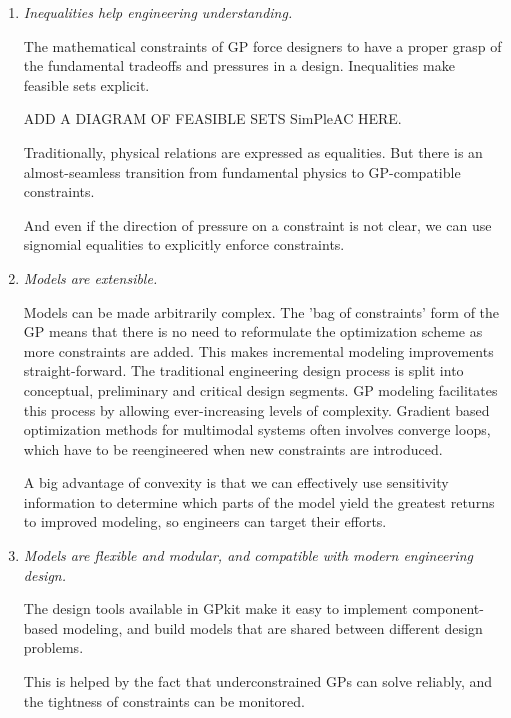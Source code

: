 \begin{enumerate}

    \item \textit{Inequalities help engineering understanding.}

The mathematical constraints of \gls{GP} force designers to have a proper grasp
of the fundamental tradeoffs and pressures in a design. Inequalities make feasible
sets explicit.

ADD A DIAGRAM OF FEASIBLE SETS SimPleAC HERE.

Traditionally, physical relations are expressed as equalities. But there is an
almost-seamless transition from fundamental physics to GP-compatible
constraints. 

And even if the direction of pressure on a constraint is not clear,
we can use signomial equalities to explicitly enforce constraints.

    \item \textit{Models are extensible.}
    
Models can be made arbitrarily complex. The 'bag of constraints' form of the GP
means that there is no need to reformulate the optimization scheme as more
constraints are added. This makes incremental modeling improvements straight-forward.
The traditional engineering design process is split into conceptual, preliminary
and critical design segments. GP modeling facilitates this process by allowing
ever-increasing levels of complexity. Gradient based optimization methods for
multimodal systems often involves
converge loops, which have to be reengineered when new constraints are
introduced.

A big advantage of convexity is that we can effectively use sensitivity information
to determine which parts of the
model yield the greatest returns to improved modeling, so engineers can target
their efforts.

    \item \textit{Models are flexible and modular, and compatible with modern
    engineering design.}

The design tools available in GPkit make it easy to
implement component-based modeling, and build models that are shared between
different design problems.

This is helped by the fact that underconstrained \gls{GP}s can solve reliably,
and the tightness of constraints can be monitored.

\end{enumerate}




